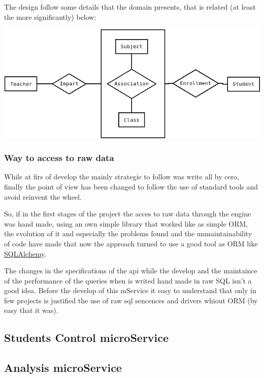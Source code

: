 The design follow some details that the domain presents, that is related
(at least the more significantly) below:

\begin{center}
\includegraphics[scale=0.4]{img/diagrams/dbms-ER.png}
\end{center}



\subsubsection{Way to access to raw data}

While at firs of develop the mainly strategie to follow was write
all by cero, finally the point of view has been changed to follow
the use of standard tools and avoid reinvent the wheel.

So, if in the first stages of the project the acces to raw data through
the engine was hand made, using an own simple library that worked
like as simple ORM, the evolution of it and especially the problems
found and the unmaintainability of code have made that now the approach
turned to use a good tool as ORM like \href{http://www.google.es}{SQLAlchemy}.

The changes in the specifications of the api while the develop and
the maintaince of the performance of the queries when is writed hand
made in raw SQL isn't a good idea. Before the develop of this mService
it easy to understand that only in few projects is justified the use
of raw sql sencences and drivers whiout ORM (by easy that it was).


\subsection{Students Control microService}


\subsection{Analysis microService}
